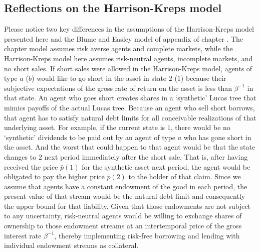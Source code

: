 \subsection{Reflections on the Harrison-Kreps model}

Please notice two 
key differences in the assumptions of the Harrison-Kreps model presented here  and the Blume and Easley model of appendix  of chapter . 
The chapter  model assumes risk averse agents 
and complete markets, while
the  Harrison-Kreps model here  assumes 
risk-neutral agents, incomplete markets, and no  short sales.  
If short sales were allowed in the Harrison-Kreps model,
agents of type $a$ ($b$) would like to go short in the 
asset in state $2$ ($1$) because  their
subjective  expectations of the  gross rate 
of return on the asset is less than $\beta^{-1}$ in that state. An
agent who goes short  creates shares in 
a `synthetic' Lucas tree that mimics  payoffs of 
the actual  Lucas tree. Because an agent who sell short borrows, that  agent has 
to satisfy  natural debt limits for all conceivable
realizations of that underlying asset. 
For example, if the current state is $1$, there
would be no `synthetic' dividends to be paid out by an 
agent of type $a$ who has gone short in the asset. 
And the worst that could happen to that agent would 
be that the state  changes to $2$  next period immediately
after the short sale. That is, after having
received the price $\bar p(1)$ for the synthetic
asset next period, the agent would be obligated  to pay the higher price $\bar p(2)$ 
to the holder of that claim. Since we assume that
agents have a constant endowment of
the good in each period, the present value of that
stream would be the natural debt limit and consequently  
the upper bound for that liability. Given that those 
endowments are not subject to any uncertainty, 
risk-neutral agents would be willing to exchange 
shares of ownership to those endowment streams at 
an intertemporal price of the gross interest rate 
$\beta^{-1}$, thereby implementing risk-free
borrowing and lending with individual endowment 
streams as collateral.

